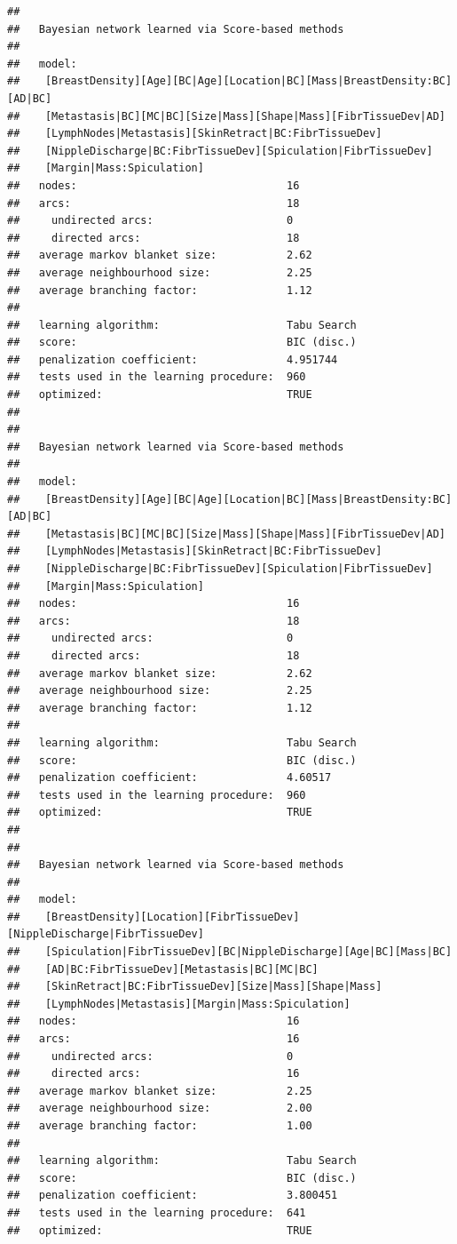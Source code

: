\documentclass[]{article}
\begin{document}
\begin{verbatim}
## 
##   Bayesian network learned via Score-based methods
## 
##   model:
##    [BreastDensity][Age][BC|Age][Location|BC][Mass|BreastDensity:BC][AD|BC]
##    [Metastasis|BC][MC|BC][Size|Mass][Shape|Mass][FibrTissueDev|AD]
##    [LymphNodes|Metastasis][SkinRetract|BC:FibrTissueDev]
##    [NippleDischarge|BC:FibrTissueDev][Spiculation|FibrTissueDev]
##    [Margin|Mass:Spiculation]
##   nodes:                                 16 
##   arcs:                                  18 
##     undirected arcs:                     0 
##     directed arcs:                       18 
##   average markov blanket size:           2.62 
##   average neighbourhood size:            2.25 
##   average branching factor:              1.12 
## 
##   learning algorithm:                    Tabu Search 
##   score:                                 BIC (disc.) 
##   penalization coefficient:              4.951744 
##   tests used in the learning procedure:  960 
##   optimized:                             TRUE 
## 
## 
##   Bayesian network learned via Score-based methods
## 
##   model:
##    [BreastDensity][Age][BC|Age][Location|BC][Mass|BreastDensity:BC][AD|BC]
##    [Metastasis|BC][MC|BC][Size|Mass][Shape|Mass][FibrTissueDev|AD]
##    [LymphNodes|Metastasis][SkinRetract|BC:FibrTissueDev]
##    [NippleDischarge|BC:FibrTissueDev][Spiculation|FibrTissueDev]
##    [Margin|Mass:Spiculation]
##   nodes:                                 16 
##   arcs:                                  18 
##     undirected arcs:                     0 
##     directed arcs:                       18 
##   average markov blanket size:           2.62 
##   average neighbourhood size:            2.25 
##   average branching factor:              1.12 
## 
##   learning algorithm:                    Tabu Search 
##   score:                                 BIC (disc.) 
##   penalization coefficient:              4.60517 
##   tests used in the learning procedure:  960 
##   optimized:                             TRUE 
## 
## 
##   Bayesian network learned via Score-based methods
## 
##   model:
##    [BreastDensity][Location][FibrTissueDev][NippleDischarge|FibrTissueDev]
##    [Spiculation|FibrTissueDev][BC|NippleDischarge][Age|BC][Mass|BC]
##    [AD|BC:FibrTissueDev][Metastasis|BC][MC|BC]
##    [SkinRetract|BC:FibrTissueDev][Size|Mass][Shape|Mass]
##    [LymphNodes|Metastasis][Margin|Mass:Spiculation]
##   nodes:                                 16 
##   arcs:                                  16 
##     undirected arcs:                     0 
##     directed arcs:                       16 
##   average markov blanket size:           2.25 
##   average neighbourhood size:            2.00 
##   average branching factor:              1.00 
## 
##   learning algorithm:                    Tabu Search 
##   score:                                 BIC (disc.) 
##   penalization coefficient:              3.800451 
##   tests used in the learning procedure:  641 
##   optimized:                             TRUE
\end{verbatim}
\end{document}
